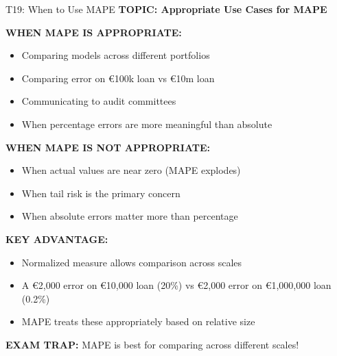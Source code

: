 \documentclass[8pt]{beamer}
\begin{document}
	\begin{frame}{T19: When to Use MAPE}
		\fontsize{6.5}{7.5}\selectfont
		\textbf{TOPIC: Appropriate Use Cases for MAPE}
		
		\vspace{0.1cm}
		\textbf{WHEN MAPE IS APPROPRIATE:}
		\begin{itemize}
			\item Comparing models across different portfolios
			\item Comparing error on €100k loan vs €10m loan
			\item Communicating to audit committees
			\item When percentage errors are more meaningful than absolute
		\end{itemize}
		
		\vspace{0.1cm}
		\textbf{WHEN MAPE IS NOT APPROPRIATE:}
		\begin{itemize}
			\item When actual values are near zero (MAPE explodes)
			\item When tail risk is the primary concern
			\item When absolute errors matter more than percentage
		\end{itemize}
		
		\vspace{0.1cm}
		\textbf{KEY ADVANTAGE:}
		\begin{itemize}
			\item Normalized measure allows comparison across scales
			\item A €2,000 error on €10,000 loan (20\%) vs €2,000 error on €1,000,000 loan (0.2\%)
			\item MAPE treats these appropriately based on relative size
		\end{itemize}
		
		\textcolor{myred}{\textbf{EXAM TRAP:}} MAPE is best for \textcolor{myblue}{comparing across different scales}!
	\end{frame}
	
\end{document}
